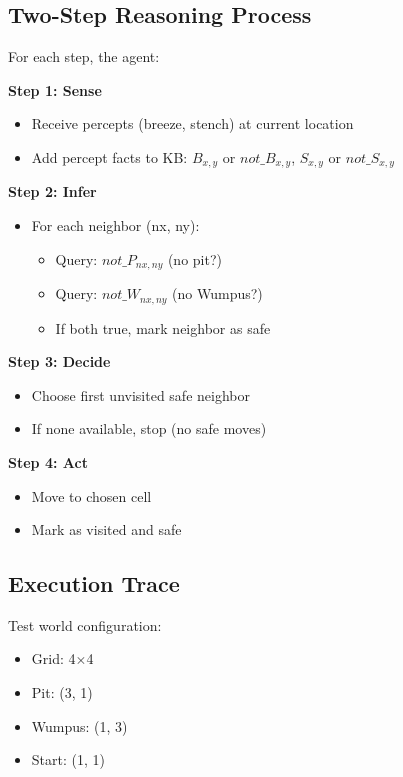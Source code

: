 \documentclass[letterpaper]{article}
\begin{document}
\subsection{Two-Step Reasoning Process}

For each step, the agent:

\textbf{Step 1: Sense}
\begin{itemize}
\item Receive percepts (breeze, stench) at current location
\item Add percept facts to KB: $B_{x,y}$ or $not\_B_{x,y}$, $S_{x,y}$ or $not\_S_{x,y}$
\end{itemize}

\textbf{Step 2: Infer}
\begin{itemize}
\item For each neighbor (nx, ny):
   \begin{itemize}
   \item Query: $not\_P_{nx,ny}$ (no pit?)
   \item Query: $not\_W_{nx,ny}$ (no Wumpus?)
   \item If both true, mark neighbor as safe
   \end{itemize}
\end{itemize}

\textbf{Step 3: Decide}
\begin{itemize}
\item Choose first unvisited safe neighbor
\item If none available, stop (no safe moves)
\end{itemize}

\textbf{Step 4: Act}
\begin{itemize}
\item Move to chosen cell
\item Mark as visited and safe
\end{itemize}

\subsection{Execution Trace}

Test world configuration:
\begin{itemize}
\item Grid: 4$\times$4
\item Pit: (3, 1)
\item Wumpus: (1, 3)
\item Start: (1, 1)
\end{itemize}
\end{document}
